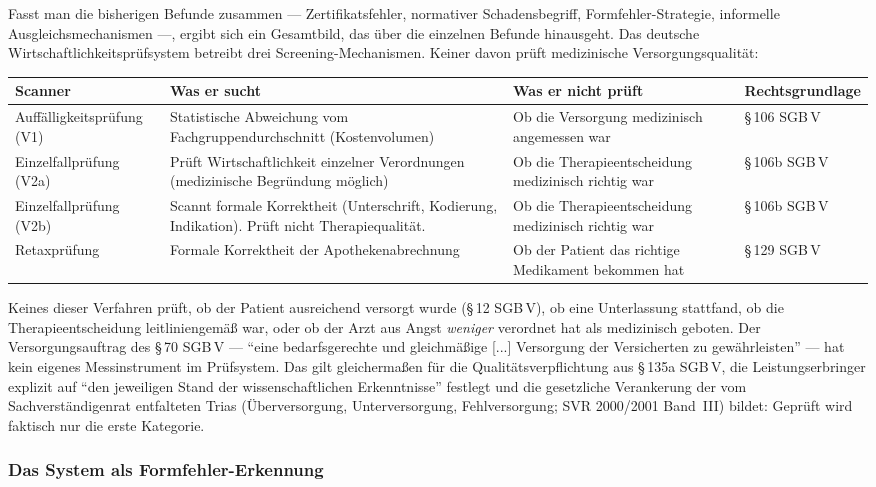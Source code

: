 \documentclass{umbruch-position}
\begin{document}
Fasst man die bisherigen Befunde zusammen --- Zertifikatsfehler, normativer Schadensbegriff, Formfehler-Strategie, informelle Ausgleichsmechanismen ---, ergibt sich ein Gesamtbild, das über die einzelnen Befunde hinausgeht. Das deutsche Wirtschaftlichkeitsprüfsystem betreibt drei Screening-Mechanismen. Keiner davon prüft medizinische Versorgungsqualität:

{\small
\begin{tabularx}{\textwidth}{l X X l}
\toprule
\textbf{Scanner} & \textbf{Was er sucht} & \textbf{Was er nicht prüft} & \textbf{Rechtsgrundlage} \\
\midrule
Auffälligkeitsprüfung (V1) & Statistische Abweichung vom Fachgruppendurchschnitt (Kosten\-volumen) & Ob die Versorgung medizinisch angemessen war & \S\,106 SGB\,V \\
\addlinespace
Einzelfallprüfung (V2a) & Prüft Wirtschaftlichkeit einzelner Verordnungen (medizinische Begründung möglich) & Ob die Therapieentscheidung medizinisch richtig war & \S\,106b SGB\,V \\
\addlinespace
Einzelfallprüfung (V2b) & Scannt formale Korrektheit (Unterschrift, Kodierung, Indikation). Prüft nicht Therapiequalität. & Ob die Therapieentscheidung medizinisch richtig war & \S\,106b SGB\,V \\
\addlinespace
Retaxprüfung & Formale Korrektheit der Apothekenabrechnung & Ob der Patient das richtige Medikament bekommen hat & \S\,129 SGB\,V \\
\bottomrule
\end{tabularx}
}

\medskip

Keines dieser Verfahren prüft, ob der Patient ausreichend versorgt wurde (\S\,12 SGB\,V), ob eine Unterlassung stattfand, ob die Therapieentscheidung leitliniengemäß war, oder ob der Arzt aus Angst \textit{weniger} verordnet hat als medizinisch geboten. Der Versorgungsauftrag des \S\,70 SGB\,V --- ``eine bedarfsgerechte und gleichmäßige [...] Versorgung der Versicherten zu gewährleisten'' --- hat kein eigenes Messinstrument im Prüfsystem. Das gilt gleichermaßen für die Qualitätsverpflichtung aus \S\,135a SGB\,V, die Leistungserbringer explizit auf ``den jeweiligen Stand der wissenschaftlichen Erkenntnisse'' festlegt und die gesetzliche Verankerung der vom Sachverständigenrat entfalteten Trias (Überversorgung, Unterversorgung, Fehlversorgung; SVR 2000/2001 Band~III) bildet: Geprüft wird faktisch nur die erste Kategorie.

\subsubsection{Das System als Formfehler-Erkennung}
\end{document}
